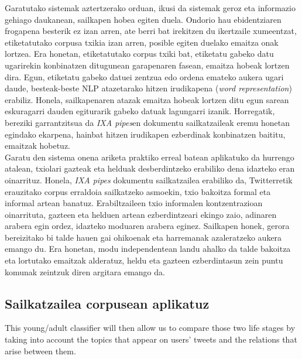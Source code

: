 \documentclass[information,article,submit,moreauthors,pdftex,10pt,a4paper]{Definitions/mdpi}
\begin{document}
\indent Garatutako sistemak aztertzerako orduan, ikusi da sistemak geroz eta informazio gehiago daukanean, sailkapen hobea egiten duela. Ondorio hau ebidentziaren frogapena besterik ez izan arren, ate berri bat irekitzen du ikertzaile xumeentzat, etiketatutako corpusa txikia izan arren, posible egiten duelako emaitza onak lortzea. Era honetan, etiketatutako corpus txiki bat, etiketatu gabeko datu ugarirekin konbinatzen ditugunean garapenaren fasean, emaitza hobeak lortzen dira. Egun, etiketatu gabeko datuei zentzua edo ordena emateko aukera ugari daude, besteak-beste NLP atazetarako hitzen irudikapena (\textit{word representation}) erabiliz. Honela, sailkapenaren atazak emaitza hobeak lortzen ditu egun sarean eskuragarri dauden egiturarik gabeko datuak lagungarri izanik. Horregatik, bereziki garrantzitsua da \textit{IXA pipes}en dokumentu sailkatzaileak eremu honetan egindako ekarpena, hainbat hitzen irudikapen ezberdinak konbinatzen baititu, emaitzak hobetuz.\\
\indent Garatu den sistema onena ariketa praktiko erreal batean aplikatuko da hurrengo atalean, txiolari gazteak eta helduak desberdintzeko erabiliko dena idazteko eran oinarrituz. Honela, \textit{IXA pipes} dokumentu sailkatzailea erabiliko da, Twitterretik erauzitako corpus erraldoia sailkatzeko asmoekin, txio bakoitza formal eta informal artean banatuz. Erabiltzaileen txio informalen kontzentrazioan oinarrituta, gazteen eta helduen artean ezberdintzeari ekingo zaio, adinaren arabera egin ordez, idazteko moduaren arabera eginez. Sailkapen honek, gerora bereizitako bi talde hauen gai ohikoenak eta harremanak azaleratzeko aukera emango du. Era honetan, modu independentean landu ahalko da talde bakoitza eta lortutako emaitzak alderatuz, heldu eta gazteen ezberdintasun zein puntu komunak zeintzuk diren argitara emango da.

\subsection{Sailkatzailea corpusean aplikatuz}\label{sec:apl}

This young/adult classifier will then allow us to compare those two life stages by taking into account the topics that appear on users' tweets and the relations that arise between them.
\end{document}
